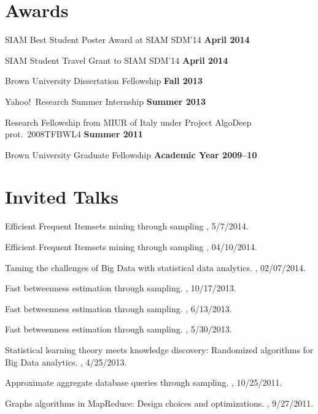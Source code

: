 \documentclass[margin,line]{resume}
\begin{document}
\section{\sc Awards}

SIAM Best Student Poster Award at SIAM SDM'14 \hfill {\bf April 2014}

SIAM Student Travel Grant to SIAM SDM'14 \hfill {\bf April 2014}

Brown University Dissertation Fellowship \hfill {\bf Fall 2013}

Yahoo!~Research Summer Internship \hfill {\bf Summer 2013}

Research Fellowship from MIUR of Italy under Project AlgoDeep prot.~2008TFBWL4
\hfill {\bf Summer 2011}

Brown University Graduate Fellowship \hfill {\bf Academic Year 2009--10}

\section{\sc Invited Talks}

Efficient Frequent Itemsets mining through sampling
, 5/7/2014.

Efficient Frequent Itemsets mining through sampling
,
04/10/2014.

Taming the challenges of Big Data with statistical data analytics.
, 02/07/2014.

Fast betweenness estimation through sampling.
, 10/17/2013.

Fast betweenness estimation through sampling.
, 6/13/2013.

Fast betweenness estimation through sampling.
, 5/30/2013.

Statistical learning theory meets knowledge discovery: Randomized algorithms for
Big Data analytics.
, 4/25/2013.

Approximate aggregate database queries through sampling.
, 10/25/2011.

Graphs algorithms in MapReduce: Design choices and optimizations.
, 9/27/2011.
\end{document}
